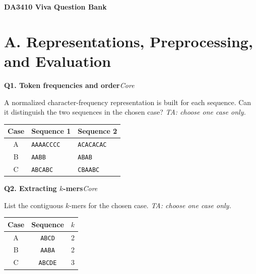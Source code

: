 \documentclass[11pt]{article}
\newif\ifshowanswers
\newenvironment{question}[3]{%
  \par\medskip
  \noindent\textbf{Q#1. #2}\hfill\textit{#3}\par\smallskip
}{\par\medskip}
\newcommand{\answer}[1]{%
  \ifshowanswers
    \begin{quote}\small\textbf{Expected answer:} #1\end{quote}
  \fi
}
\newcommand{\marking}[1]{%
  \ifshowanswers
    \begin{quote}\small\textbf{1 mark:} #1\end{quote}
  \fi
}
\newcommand{\casesnote}{\textit{TA: choose one case only.}}
\begin{document}
\begin{center}
    {\LARGE \textbf{DA3410 Viva Question Bank}}\\[4pt]
\end{center}

\section*{A. Representations, Preprocessing, and Evaluation}

\begin{question}{1}{Token frequencies and order}{Core}
A normalized character-frequency representation is built for each sequence. Can it distinguish the two sequences in the chosen case? \casesnote

\begin{center}
\begin{tabular}{cll}
\toprule
Case & Sequence 1 & Sequence 2 \\
\midrule
A & \texttt{AAAACCCC} & \texttt{ACACACAC} \\
B & \texttt{AABB} & \texttt{ABAB} \\
C & \texttt{ABCABC} & \texttt{CBAABC} \\
\bottomrule
\end{tabular}
\end{center}

\answer{No in all three cases. The sequences have the same character counts, so normalized token frequencies are identical even though their order differs.}
\marking{Student states that token-frequency features are order-invariant and therefore cannot distinguish the pair.}
\end{question}

\begin{question}{2}{Extracting $k$-mers}{Core}
List the contiguous $k$-mers for the chosen case. \casesnote

\begin{center}
\begin{tabular}{ccc}
\toprule
Case & Sequence & $k$ \\
\midrule
A & \texttt{ABCD} & 2 \\
B & \texttt{AABA} & 2 \\
C & \texttt{ABCDE} & 3 \\
\bottomrule
\end{tabular}
\end{center}

\answer{A: \texttt{AB, BC, CD}. B: \texttt{AA, AB, BA}. C: \texttt{ABC, BCD, CDE}.}
\marking{All contiguous $k$-mers for the chosen case are listed correctly.}
\end{question}
\end{document}
